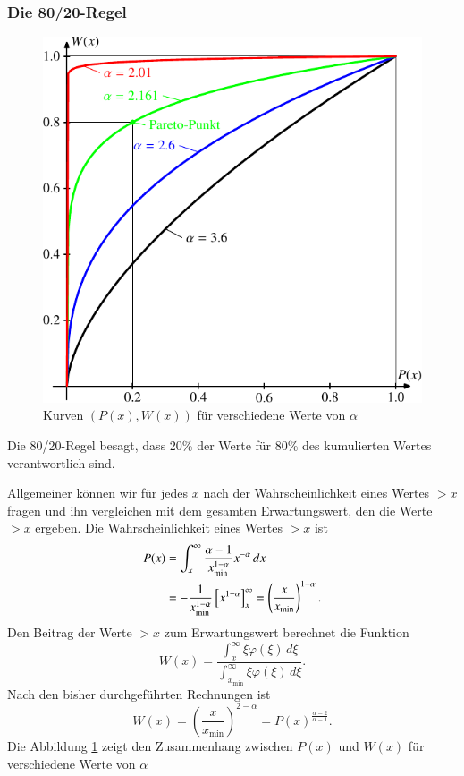 \subsubsection{Die 80/20-Regel}
\begin{figure}
\begin{center}
\includegraphics{images/power-4.pdf}
\end{center}
\caption{Kurven $(P(x),W(x))$ für verschiedene Werte von $\alpha$\label{wp}}
\end{figure}
Die 80/20-Regel besagt, dass 20\% der Werte für 80\% des kumulierten Wertes
verantwortlich sind.

Allgemeiner können wir für jedes $x$ nach der Wahrscheinlichkeit
eines Wertes $>x$ fragen und ihn vergleichen mit dem gesamten Erwartungswert,
den die Werte $>x$ ergeben.
Die Wahrscheinlichkeit eines Wertes $>x$ ist
\begin{align}
P(x)
&=
\int_x^\infty
\frac{\alpha-1}{x_{\min}^{1-\alpha}}
x^{-\alpha}
\,dx
\notag
\\
&=
-\frac{1}{x_{\min}^{1-\alpha}}
\left[x^{1-\alpha}\right]_x^\infty
=
\left(
\frac{x}{x_{\min}}
\right)^{1-\alpha}.
\label{px}
\end{align}
Den Beitrag der Werte $>x$ zum Erwartungswert berechnet die Funktion
\begin{equation}
W(x)=\frac%
{\int_x^\infty \xi\varphi(\xi)\,d\xi}%
{\int_{x_{\min}}^\infty \xi\varphi(\xi)\,d\xi}.
\label{wx}
\end{equation}
Nach den bisher durchgeführten Rechnungen ist
\[
W(x)=\left(\frac{x}{x_{\min}}\right)^{2-\alpha}
=P(x)^{\frac{\alpha-2}{\alpha-1}}.
\]
Die Abbildung \ref{wp} zeigt den Zusammenhang zwischen $P(x)$ und $W(x)$
für verschiedene Werte von $\alpha$

